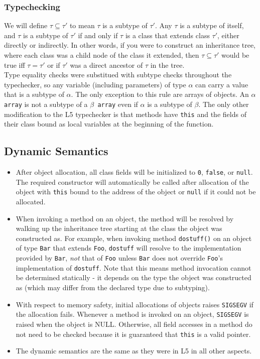 \documentclass{article}
\begin{document}
\subsubsection{Typechecking}
We will define $\tau \subseteq \tau'$ to mean $\tau$ is a subtype of $\tau'$.
Any $\tau$ is a subtype of itself, and $\tau$ is a subtype of $\tau'$ if and only
if $\tau$ is a class that extends class $\tau'$, either directly or indirectly.
In other words, if you were to construct an inheritance tree, where each class
was a child node of the class it extended, then $\tau \subseteq \tau'$ would be
true iff $\tau = \tau'$ or if $\tau'$ was a direct ancestor of $\tau$ in the
tree. \\

Type equality checks were substitued with subtype checks throughout the
typechecker, so any variable (including parameters) of type $\alpha$ can carry
a value that is a subtype of $\alpha$. The only exception to this
rule are arrays of objects. An \texttt{$\alpha$ array} is not a subtype of a
\texttt{$\beta$ array} even if \texttt{$\alpha$} is a subtype of
\texttt{$\beta$}. The only other modification to the L5 typechecker is that
methods have \texttt{this} and the fields of their class bound as local
variables at the beginning of the function.

\subsection{Dynamic Semantics}
\begin{itemize}
\item After object allocation, all class fields will be initialized to \texttt{0},
      \texttt{false}, or \texttt{null}. The required constructor will
      automatically be called after allocation of the object with \texttt{this}
      bound to the address of the object or \texttt{null} if it could not be
      allocated.
\item When invoking a method on an object, the method will be resolved by
      walking up the inheritance tree starting at the class the object was
      constructed as. For example, when invoking
      method \texttt{dostuff()} on an object of type \texttt{Bar} that extends
      \texttt{Foo}, \texttt{dostuff} will resolve to the implementation provided
      by \texttt{Bar}, \emph{not} that of \texttt{Foo} unless \texttt{Bar} does
      not override \texttt{Foo}'s implementation of \texttt{dostuff}. Note that
      this means method invocation cannot be determined statically - it depends
      on the type the object was constructed as (which may differ from the
      declared type due to subtyping).
\item With respect to memory safety, initial allocations of objects raises
      \texttt{SIGSEGV} if the allocation fails. Whenever a method is invoked
      on an object, \texttt{SIGSEGV} is raised when the object is NULL.
      Otherwise, all field accesses in a method do not need to be checked
      because it is guaranteed that \texttt{this} is a valid pointer.
\item The dynamic semantics are the same as they were in L5 in all other
      aspects.
\end{itemize}
\end{document}
